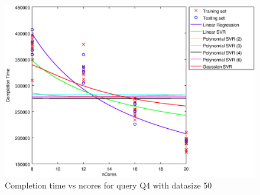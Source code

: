 
\begin {figure}[hbtp]
\centering
\includegraphics[width=\textwidth]{output/Q4_50_ALL_WITH_1_OVER_NCORES/plot_Q4_50.eps}
\caption{Completion time vs ncores for query Q4 with datasize 50}
\label{fig:all_linear_Q4_50}
\end {figure}

